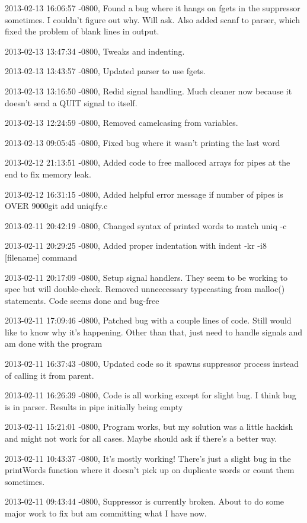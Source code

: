 \documentclass[letterpaper,10pt,titlepage]{article}
\begin{document}
\begin{enumerate}
2013-02-13 16:06:57 -0800, Found a bug where it hangs on fgets in the suppressor sometimes. I couldn't figure out why. Will ask. Also added scanf to parser, which fixed the problem of blank lines in output.

2013-02-13 13:47:34 -0800, Tweaks and indenting.

2013-02-13 13:43:57 -0800, Updated parser to use fgets.

2013-02-13 13:16:50 -0800, Redid signal handling. Much cleaner now because it doesn't send a QUIT signal to itself.

2013-02-13 12:24:59 -0800, Removed camelcasing from variables.

2013-02-13 09:05:45 -0800, Fixed bug where it wasn't printing the last word

2013-02-12 21:13:51 -0800, Added code to free malloced arrays for pipes at the end to fix memory leak.

2013-02-12 16:31:15 -0800, Added helpful error message if number of pipes is OVER 9000git add uniqify.c

2013-02-11 20:42:19 -0800, Changed syntax of printed words to match uniq -c

2013-02-11 20:29:25 -0800, Added proper indentation with indent -kr -i8 [filename] command

2013-02-11 20:17:09 -0800, Setup signal handlers. They seem to be working to spec but will double-check. Removed unneccessary typecasting from malloc() statements. Code seems done and bug-free

2013-02-11 17:09:46 -0800, Patched bug with a couple lines of code. Still would like to know why it's happening. Other than that, just need to handle signals and am done with the program

2013-02-11 16:37:43 -0800, Updated code so it spawns suppressor process instead of calling it from parent.

2013-02-11 16:26:39 -0800, Code is all working except for slight bug. I think bug is in parser. Results in pipe initially being empty

2013-02-11 15:21:01 -0800, Program works, but my solution was a little hackish and might not work for all cases. Maybe should ask if there's a better way.

2013-02-11 10:43:37 -0800, It's mostly working! There's just a slight bug in the printWords function where it doesn't pick up on duplicate words or count them sometimes.

2013-02-11 09:43:44 -0800, Suppressor is currently broken. About to do some major work to fix but am committing what I have now.


\end{enumerate}
\end{document}
